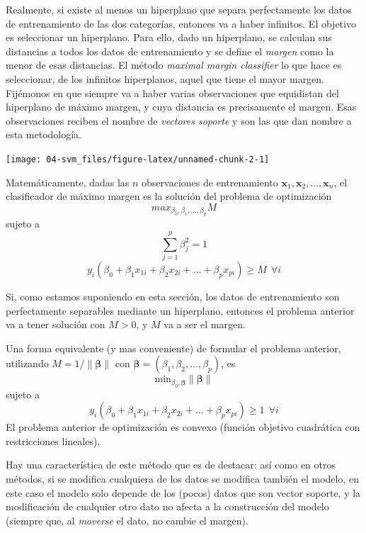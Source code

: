 \documentclass[
  spanish,
]{book}
\theoremstyle{break}
\theoremstyle{definition}
\theoremstyle{definition}
\theoremstyle{definition}
\theoremstyle{definition}
\theoremstyle{remark}
\begin{document}
Realmente, si existe al menos un hiperplano que separa perfectamente los datos de entrenamiento de las dos categorías, entonces va a haber infinitos. El objetivo es seleccionar un hiperplano. Para ello, dado un hiperplano, se calculan sus distancias a todos los datos de entrenamiento y se define el \emph{margen} como la menor de esas distancias. El método \emph{maximal margin classifier} lo que hace es seleccionar, de los infinitos hiperplanos, aquel que tiene el mayor margen. Fijémonos en que siempre va a haber varias observaciones que equidistan del hiperplano de máximo margen, y cuya distancia es precisamente el margen. Esas observaciones reciben el nombre de \emph{vectores soporte} y son las que dan nombre a esta metodología.

\begin{center}\texttt{[image: 04-svm\_files/figure-latex/unnamed-chunk-2-1]} \end{center}

Matemáticamente, dadas las \(n\) observaciones de entrenamiento \(\mathbf{x}_1, \mathbf{x}_2, \ldots, \mathbf{x}_n\), el clasificador de máximo margen es la solución del problema de optimización
\[max_{\beta_0, \beta_1,\ldots, \beta_p} M\]
sujeto a
\[\sum_{j=1}^p \beta_j^2 = 1\]
\[ y_i(\beta_0 + \beta_1 x_{1i} + \beta_2 x_{2i} + \ldots + \beta_p x_{pi}) \ge M \ \ \forall i\]

Si, como estamos suponiendo en esta sección, los datos de entrenamiento son perfectamente separables mediante un hiperplano, entonces el problema anterior va a tener solución con \(M>0\), y \(M\) va a ser el margen.

Una forma equivalente (y mas conveniente) de formular el problema anterior, utilizando \(M = 1/\lVert \boldsymbol{\beta} \rVert\) con \(\boldsymbol{\beta} = (\beta_1, \beta_2, \ldots, \beta_p)\), es
\[\mbox{min}_{\beta_0, \boldsymbol{\beta}} \lVert \boldsymbol{\beta} \rVert\]
sujeto a
\[ y_i(\beta_0 + \beta_1 x_{1i} + \beta_2 x_{2i} + \ldots + \beta_p x_{pi}) \ge 1 \ \ \forall i\]
El problema anterior de optimización es convexo (función objetivo cuadrática con restricciones lineales).

Hay una característica de este método que es de destacar: así como en otros métodos, si se modifica cualquiera de los datos se modifica también el modelo, en este caso el modelo solo depende de los (pocos) datos que son vector soporte, y la modificación de cualquier otro dato no afecta a la construcción del modelo (siempre que, al \emph{moverse} el dato, no cambie el margen).
\end{document}
